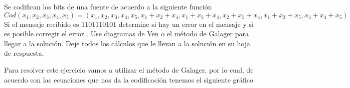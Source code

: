 
Se codifican los bits de una fuente de acuerdo a la siguiente función 
$$Cod (x_1, x_2, x_3, x_4, x_5) = (x_1, x_2, x_3, x_4, x_5, x_1 + x_2 + x_4, x_1 + x_3 + x_4, x_2 + x_3 + x_4, x_1 + x_3 + x_5, x_3 + x_4 + x_5)$$
Si el mensaje recibido es $1101110101$ determine si hay un error en el mensaje
y si es posible corregir el error . Use diagramas de Ven o el método de Galager
para llegar a la solución. Deje todos los cálculos que le llevan a la solución en su hoja de respuesta.
\begin{sol}
Para resolver este ejercicio vamos a utilizar el método de Galager, por lo cual, de acuerdo con las ecuaciones que nos da la codificación tenemos el siguiente gráfico 
\begin{center}



\begin{tikzpicture}[x=0.75pt,y=0.75pt,yscale=-1,xscale=1]


\end{tikzpicture}
\end{center}
\end{sol}

